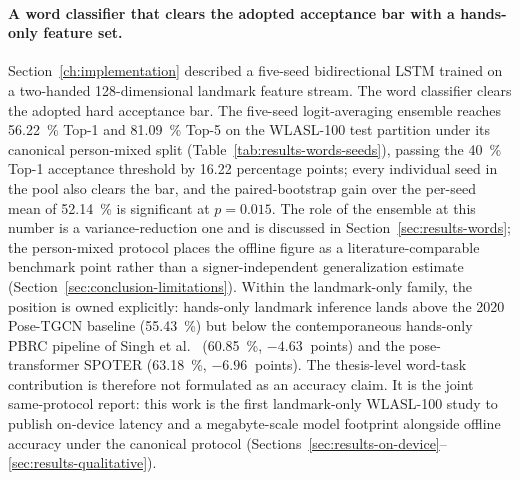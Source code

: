 \paragraph{A word classifier that clears the adopted acceptance bar
with a hands-only feature set.}
Section~\ref{ch:implementation} described a five-seed bidirectional
LSTM trained on a two-handed 128-dimensional landmark feature stream.
The word classifier clears the adopted hard acceptance bar. The
five-seed logit-averaging ensemble reaches \SI{56.22}{\percent}
Top-1 and \SI{81.09}{\percent} Top-5 on the WLASL-100 test
partition under its canonical person-mixed split
(Table~\ref{tab:results-words-seeds}), passing the
\SI{40}{\percent} Top-1 acceptance threshold by 16.22 percentage
points; every individual seed in the pool also clears the bar, and
the paired-bootstrap gain over the per-seed mean of
\SI{52.14}{\percent} is significant at $p = 0.015$. The role of
the ensemble at this number is a variance-reduction one and is
discussed in Section~\ref{sec:results-words}; the person-mixed
protocol places the offline figure as a literature-comparable
benchmark point rather than a signer-independent generalization
estimate (Section~\ref{sec:conclusion-limitations}). Within the
landmark-only family, the position is owned explicitly: hands-only
landmark inference lands above the 2020 Pose-TGCN baseline
(\SI{55.43}{\percent}) but below the contemporaneous hands-only
PBRC pipeline of Singh et al.~\cite{singh2026pbrc}
(\SI{60.85}{\percent}, ${-}\SI{4.63}{}$ points) and the
pose-transformer SPOTER (\SI{63.18}{\percent},
${-}\SI{6.96}{}$ points). The thesis-level word-task
contribution is therefore not formulated as an accuracy claim. It
is the joint same-protocol report: this work is the first
landmark-only WLASL-100 study to publish on-device latency and a
megabyte-scale model footprint alongside offline accuracy under
the canonical protocol
(Sections~\ref{sec:results-on-device}--\ref{sec:results-qualitative}).

